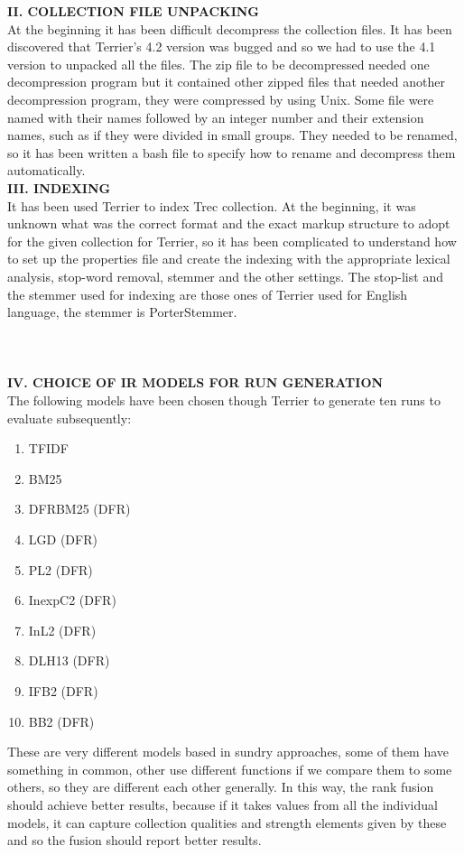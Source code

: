 \documentclass[12pt,journal]{IEEEtran}
\begin{document}
\textbf{II.	COLLECTION FILE UNPACKING} \\
At the beginning it has been difficult decompress the collection files. It has been discovered that Terrier’s 4.2 version was bugged and so we had to use the 4.1 version to unpacked all the files.
The zip file to be decompressed needed one decompression program but it contained other zipped files that needed another decompression program, they were compressed by using Unix. Some file were named with their names followed by an integer number and their extension names, such as if they were divided in small groups. They needed to be renamed, so it has been written a bash file to specify how to rename and decompress them automatically. \\

\textbf{III. INDEXING} \\
It has been used Terrier to index Trec collection. 
At the beginning, it was unknown what was the correct format and the exact markup structure to adopt for the given collection for Terrier, so it has been complicated to understand how to set up the properties file and create the indexing with the appropriate lexical analysis, stop-word removal, stemmer and the other settings. The stop-list and the stemmer used for indexing are those ones of Terrier used for English language, the stemmer is PorterStemmer. \\ \\ \\ \\

\textbf{IV. CHOICE OF IR MODELS FOR RUN GENERATION} \\
The following models have been chosen though Terrier to generate ten runs to evaluate subsequently: 
\begin{enumerate}
\item TFIDF
\item BM25
\item DFRBM25 (DFR)
\item LGD (DFR)
\item PL2 (DFR)
\item InexpC2 (DFR)
\item InL2 (DFR)
\item DLH13 (DFR)
\item IFB2 (DFR)
\item BB2 (DFR)
\end{enumerate} 
These are very different models based in sundry approaches, some of them have something in common, other use different functions if we compare them to some others, so they are different each other generally. In this way, the rank fusion should achieve better results, because if it takes values from all the individual models, it can capture collection qualities and strength elements given by these and so the fusion should report better results. \\
\end{document}
